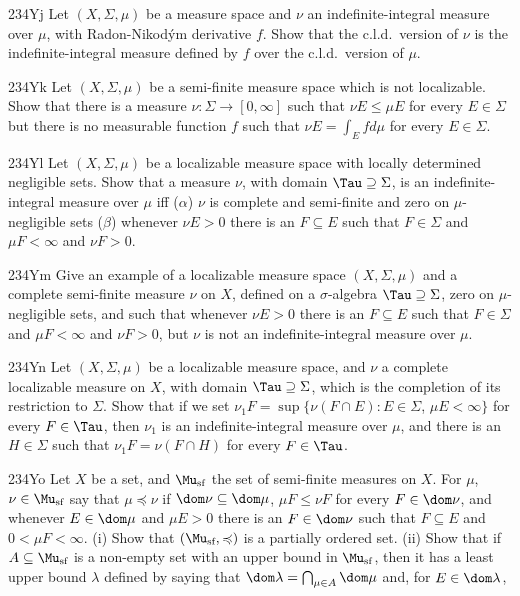 {\spheader 234Yj
 Let $(X,\Sigma,\mu)$ be a measure space and $\nu$ an
indefinite-integral measure over $\mu$, with Radon-Nikod\'ym derivative
$f$.   Show that the c.l.d.\ version of $\nu$ is the indefinite-integral
measure defined by $f$ over the c.l.d.\ version of $\mu$.

\spheader 234Yk
Let $(X,\Sigma,\mu)$ be a semi-finite measure space which is not
localizable.   Show that there is a measure $\nu:\Sigma\to[0,\infty]$
such that $\nu E\le\mu E$ for every $E\in\Sigma$ but there is no
measurable
function $f$ such that $\nu E=\int_Efd\mu$ for every $E\in\Sigma$.

\spheader 234Yl
Let $(X,\Sigma,\mu)$ be a localizable measure space with
locally determined negligible sets.   Show that a measure $\nu$,
with domain $\Tau\supseteq\Sigma$, is an indefinite-integral measure
over $\mu$ iff ($\alpha$) $\nu$ is complete and semi-finite and zero on
$\mu$-negligible sets
($\beta$) whenever $\nu E>0$ there is an $F\subseteq E$ such that
$F\in\Sigma$ and $\mu F<\infty$ and $\nu F>0$.

\spheader 234Ym
 Give an example of a localizable measure space
$(X,\Sigma,\mu)$ and a complete semi-finite measure $\nu$ on $X$,
defined on
a $\sigma$-algebra $\Tau\supseteq\Sigma$, zero on $\mu$-negligible sets,
and such that whenever $\nu E>0$ there
is an $F\subseteq E$ such that $F\in\Sigma$ and $\mu F<\infty$ and
$\nu F>0$, but $\nu$ is not an indefinite-integral measure over $\mu$.

\spheader 234Yn
 Let $(X,\Sigma,\mu)$ be a localizable measure space, and
$\nu$ a complete localizable measure on $X$, with domain
$\Tau\supseteq\Sigma$, which is the completion of its restriction to
$\Sigma$.   Show that if we set
$\nu_1F=\sup\{\nu(F\cap E):E\in\Sigma$, $\mu E<\infty\}$ for every
$F\in\Tau$, then $\nu_1$ is an indefinite-integral measure over $\mu$,
and there is an $H\in\Sigma$ such that $\nu_1F=\nu(F\cap H)$ for every
$F\in\Tau$.

\spheader 234Yo
Let $X$ be a set, and $\Mu_{\text{sf}}$ the set of
semi-finite measures
on $X$.   For $\mu$, $\nu\in\Mu_{\text{sf}}$ say that $\mu\preccurlyeq\nu$
if $\dom\nu\subseteq\dom\mu$, $\mu F\le\nu F$ for every $F\in\dom\nu$, and
whenever $E\in\dom\mu$ and $\mu E>0$ there is an $F\in\dom\nu$ such that
$F\subseteq E$ and $0<\mu F<\infty$.   (i) Show that
$(\Mu_{\text{sf}},\preccurlyeq)$ is a
partially ordered set.   (ii) Show that if $A\subseteq\Mu_{\text{sf}}$
is a non-empty
set with an upper bound in $\Mu_{\text{sf}}$, then it has a least upper
bound $\lambda$
defined by saying that $\dom\lambda=\bigcap_{\mu\in A}\dom\mu$ and, for
$E\in\dom\lambda$,

}
